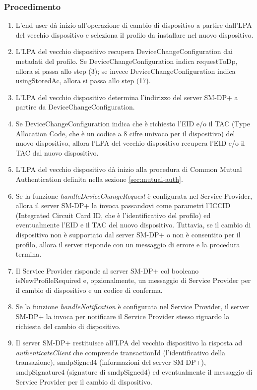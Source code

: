 \documentclass[10pt, oneside]{book}
\begin{document}
\subsubsection{Procedimento}
\begin{enumerate}
\item L'end user dà inizio all'operazione di cambio di dispositivo a partire dall'LPA del vecchio dispositivo e seleziona il profilo da installare nel nuovo dispositivo.
\item L'LPA del vecchio dispositivo recupera DeviceChangeConfiguration dai metadati del profilo. Se DeviceChangeConfiguration indica requestToDp, allora si passa allo step (3); se invece DeviceChangeConfiguration indica usingStoredAc, allora si passa allo step (17).
\item L'LPA del vecchio dispositivo determina l'indirizzo del server SM-DP+ a partire da DeviceChangeConfiguration.
\item Se DeviceChangeConfiguration indica che è richiesto l'EID e/o il TAC (Type Allocation Code, che è un codice a 8 cifre univoco per il dispositivo) del nuovo dispositivo, allora l'LPA del vecchio dispositivo recupera l'EID e/o il TAC dal nuovo dispositivo.
\item L'LPA del vecchio dispositivo dà inizio alla procedura di Common Mutual Authentication definita nella sezione \ref{sec:mutual-auth}.
\item Se la funzione \textit{handleDeviceChangeRequest} è configurata nel Service Provider, allora il server SM-DP+ la invoca passandovi come parametri l'ICCID (Integrated Circuit Card ID, che è l'identificativo del profilo) ed eventualmente l'EID e il TAC del nuovo dispositivo. Tuttavia, se il cambio di dispositivo non è supportato dal server SM-DP+ o non è consentito per il profilo, allora il server risponde con un messaggio di errore e la procedura termina.
\item Il Service Provider risponde al server SM-DP+ col booleano isNewProfileRequired e, opzionalmente, un messaggio di Service Provider per il cambio di dispositivo e un codice di conferma.
\item Se la funzione \textit{handleNotification} è configurata nel Service Provider, il server SM-DP+ la invoca per notificare il Service Provider stesso riguardo la richiesta del cambio di dispositivo.
\item Il server SM-DP+ restituisce all'LPA del vecchio dispositivo la risposta ad \textit{authenticateClient} che comprende transactionId (l'identificativo della transazione), smdpSigned4 (informazioni del server SM-DP+), smdpSignature4 (signature di smdpSigned4) ed eventualmente il messaggio di Service Provider per il cambio di dispositivo.

\end{enumerate}
\end{document}
